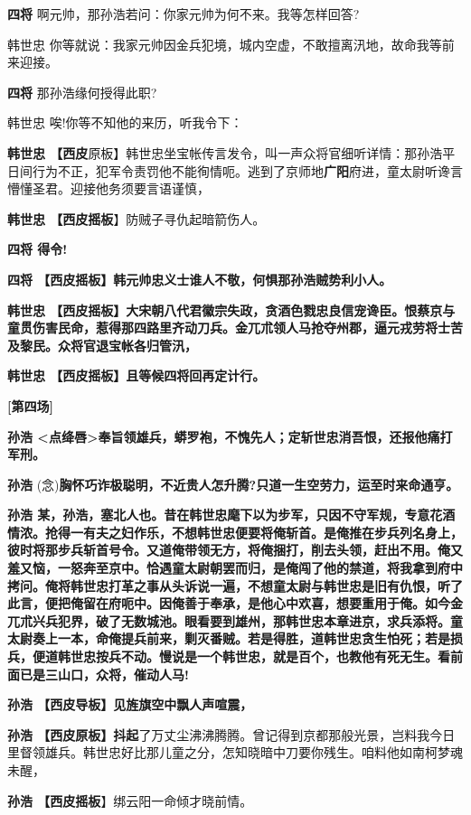 \textbf{四将} 啊元帅，那孙浩若问：你家元帅为何不来。我等怎样回答?

韩世忠
你等就说：我家元帅因金兵犯境，城内空虚，不敢擅离汛地，故命我等前来迎接。

\textbf{四将} 那孙浩缘何授得此职?

韩世忠 唉!你等不知他的来历，听我令下：

\textbf{韩世忠
【西皮}原板】韩世忠坐宝帐传言发令，叫一声众将官细听详情：那孙浩平日间行为不正，犯军令责罚他不能徇情呃。逃到了京师地\textbf{广阳}府进，童太尉听谗言懵懂圣君。迎接他务须要言语谨慎，

\textbf{韩世忠 【西皮摇板}】防贼子寻仇起暗箭伤人。

\textbf{四将 得令!}

\textbf{四将 【西皮摇板】韩元帅忠义士谁人不敬，何惧那孙浩贼势利小人。}

\textbf{韩世忠
【西皮摇板】大宋朝八代君徽宗失政，贪酒色戮忠良信宠谗臣。恨蔡京与童贯伤害民命，惹得那四路里齐动刀兵。金兀朮领人马抢夺州郡，逼元戎劳将士苦及黎民。众将官退宝帐各归管汛，}

\textbf{韩世忠 【西皮摇板】且等候四将回再定计行。}

\textbf{{[}第四场{]}}

\textbf{孙浩
\textless{}点绛唇\textgreater{}奉旨领雄兵，蟒罗袍，不愧先人；定斩世忠消吾恨，还报他痛打军刑。}

\textbf{孙浩}
(念)\textbf{胸怀巧诈极聪明，不近贵人怎升腾?只道一生空劳力，运至时来命通亨。}

\textbf{孙浩
某，孙浩，塞北人也。昔在韩世忠麾下以为步军，只因不守军规，专意花酒情浓。抢得一有夫之妇作乐，不想韩世忠便要将俺斩首。是俺推在步兵列名身上，彼时将那步兵斩首号令。又道俺带领无方，将俺捆打，削去头领，赶出不用。俺又羞又恼，一怒奔至京中。恰遇童太尉朝罢而归，是俺闯了他的禁道，将我拿到府中拷问。俺将韩世忠打革之事从头诉说一遍，不想童太尉与韩世忠是旧有仇恨，听了此言，便把俺留在府呃中。因俺善于奉承，是他心中欢喜，想要重用于俺。如今金兀朮兴兵犯界，破了无数城池。眼看要到雄州，那韩世忠本章进京，求兵添将。童太尉奏上一本，命俺提兵前来，剿灭番贼。若是得胜，道韩世忠贪生怕死；若是损兵，便道韩世忠按兵不动。慢说是一个韩世忠，就是百个，也教他有死无生。看前面已是三山口，众将，催动人马!}

\textbf{孙浩 【西皮导板】见旌旗空中飘人声喧震，}

\textbf{孙浩
【西皮原板】抖起}了万丈尘沸沸腾腾。曾记得到京都那般光景，岂料我今日里督领雄兵。韩世忠好比那儿童之分，怎知晓暗中刀要你残生。咱料他如南柯梦魂未醒，

\textbf{孙浩 【西皮摇板}】绑云阳一命倾才晓前情。

